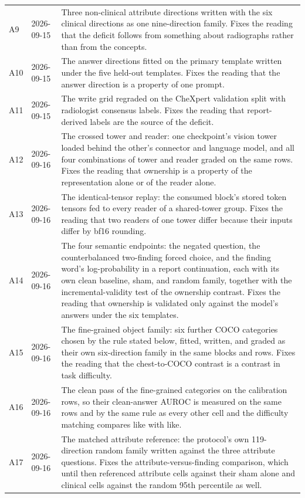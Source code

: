 \documentclass{article}
\begin{document}
\begin{table}[h]
\begin{tabular}{ll>{\raggedright\arraybackslash}p{}}
A9 & 2026-09-15 & Three non-clinical attribute directions written with the six clinical directions as one nine-direction family. Fixes the reading that the deficit follows from something about radiographs rather than from the concepts. \\
A10 & 2026-09-15 & The answer directions fitted on the primary template written under the five held-out templates. Fixes the reading that the answer direction is a property of one prompt. \\
A11 & 2026-09-15 & The write grid regraded on the CheXpert validation split with radiologist consensus labels. Fixes the reading that report-derived labels are the source of the deficit. \\
A12 & 2026-09-16 & The crossed tower and reader: one checkpoint's vision tower loaded behind the other's connector and language model, and all four combinations of tower and reader graded on the same rows. Fixes the reading that ownership is a property of the representation alone or of the reader alone. \\
A13 & 2026-09-16 & The identical-tensor replay: the consumed block's stored token tensors fed to every reader of a shared-tower group. Fixes the reading that two readers of one tower differ because their inputs differ by bf16 rounding. \\
A14 & 2026-09-16 & The four semantic endpoints: the negated question, the counterbalanced two-finding forced choice, and the finding word's log-probability in a report continuation, each with its own clean baseline, sham, and random family, together with the incremental-validity test of the ownership contrast. Fixes the reading that ownership is validated only against the model's answers under the six templates. \\
A15 & 2026-09-16 & The fine-grained object family: six further COCO categories chosen by the rule stated below, fitted, written, and graded as their own six-direction family in the same blocks and rows. Fixes the reading that the chest-to-COCO contrast is a contrast in task difficulty. \\
A16 & 2026-09-16 & The clean pass of the fine-grained categories on the calibration rows, so their clean-answer AUROC is measured on the same rows and by the same rule as every other cell and the difficulty matching compares like with like. \\
A17 & 2026-09-16 & The matched attribute reference: the protocol's own 119-direction random family written against the three attribute questions. Fixes the attribute-versus-finding comparison, which until then referenced attribute cells against their sham alone and clinical cells against the random 95th percentile as well. \\

\end{tabular}
\end{table}
\end{document}
